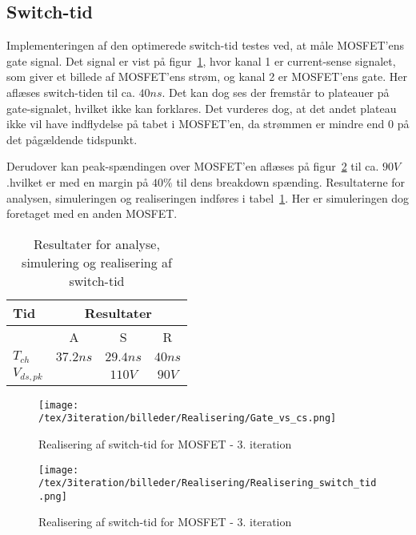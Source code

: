 

\subsection{Switch-tid}
Implementeringen af den optimerede switch-tid testes ved, at måle MOSFET'ens gate signal. Det signal er vist på figur~\ref{fig:realisering_switch_tid_3}, hvor kanal 1 er current-sense signalet, som giver et billede af MOSFET'ens strøm, og kanal 2 er MOSFET'ens gate. Her aflæses switch-tiden til ca. $40ns$. Det kan dog ses der fremstår to plateauer på gate-signalet, hvilket ikke kan forklares. Det vurderes dog, at det andet plateau ikke vil have indflydelse på tabet i MOSFET'en, da strømmen er mindre end 0 på det pågældende tidspunkt.

Derudover kan peak-spændingen over MOSFET'en aflæses på figur~\ref{fig:realisering_switch_tid_drain_3} til ca. $90V$.hvilket er med en margin på $40\percent$ til dens breakdown spænding. Resultaterne for analysen, simuleringen og realiseringen indføres i tabel~\ref{tab:resultat_switch_tid_3}. Her er simuleringen dog foretaget med en anden MOSFET.

\begin{table}[H] 			
	\centering
	\begin{tabularx}{\textwidth}{|X|c|c|c|}
		\hline
		\textbf{Tid} & \multicolumn{3}{|c|}{\textbf{Resultater}} 										\\ \hline
		& A & S & R 									\\ \hline
		$T_{ch}$    & $37.2ns$ & $29.4ns$ & $40ns$ 											\\ \hline 
		$V_{ds,pk}$ &          & $110V$   & $90V$		\\ \hline 
		
	\end{tabularx}
	\caption{Resultater for analyse, simulering og realisering af switch-tid}
	\label{tab:resultat_switch_tid_3}
\end{table}

\begin{figure}[H]
	\center
	\texttt{[image: /tex/3iteration/billeder/Realisering/Gate\_vs\_cs.png]}
	\caption{Realisering af switch-tid for MOSFET - 3. iteration}
	\label{fig:realisering_switch_tid_3}
\end{figure}

\begin{figure}[H]
	\center
	\texttt{[image: /tex/3iteration/billeder/Realisering/Realisering\_switch\_tid.png]}
	\caption{Realisering af switch-tid for MOSFET - 3. iteration}
	\label{fig:realisering_switch_tid_drain_3}
\end{figure}